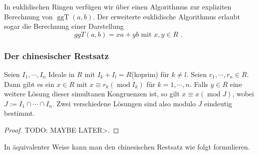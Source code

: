 In euklidischen Ringen verfügen wir über einen Algorithmus zur expliziten Berechnung von $\operatorname{ggT}(a, b) .$ Der erweiterte euklidische Algorithmus erlaubt sogar die Berechnung einer Darstellung
$$
    g g T(a, b)=x a+y b \text { mit } x, y \in R \text { . }
$$

\subsubsection{Der chinesischer Restsatz}
\begin{theorem}
    Seien \(I_1,\cdots ,I_n\) Ideale in \(R\) mit \(I_k+I_l=R\)(koprim) f\"ur \(k\not = l\). Seien \(r_1,\cdots,r_n\in R\). Dann gibt es ein \(x\in R\) mit \(x\equiv r_k(\operatorname{mod} I_k)\) f\"ur \(k=1,\cdots,n\). Falls \(y\in R\) eine weitere L\"osung dieser simultanen Kongruenzen ist, so gilt \(x\equiv x(\operatorname{mod} J)\), wobei \(J:=I_1\cap\cdots\cap I_n\). Zwei verschiedene L\"osungen sind also modulo \(J\) eindeutig bestimmt.
\end{theorem}
\begin{proof}
    TODO: MAYBE LATER>.
\end{proof}

In \"aquivalenter Weise kann man den chinesischen Restsatz wie folgt formulieren.

